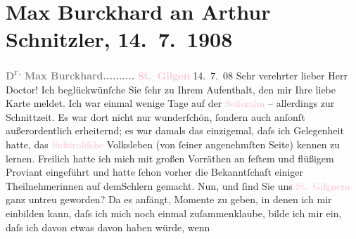 

               \section[Max Burckhard an Arthur Schnitzler, 14. 7. 1908]{ Max Burckhard an Arthur Schnitzler, 14. 7. 1908}\nopagebreak{}\rehead{ }\normalsize\beginnumbering{} \toendnotes[C]{\smallbreak\pagebreak[2]} 
\toendnotes[C]{\smallbreak}\pstart
           \noindent{}{\pb}\textcolor{gray}{\textbf{D\textsuperscript{r.} Max Burckhard}}\hfill \textcolor{gray}{\textbf{\strikeout{\textcolor{pink}{Wien, IX. Porzellangasse 48}{}\ledrightnote{\textcolor{pink}{Porzellangasse}}}{ }..........}}\pend
           \pstart
           \raggedleft{}\textcolor{gray}{\textbf{\textcolor{pink}{St. Gilgen}{}\ledrightnote{\textcolor{pink}{St. Gilgen}}}}{ }14. 7. 08\pend
           \pstart{}Sehr verehrter lieber Herr Doctor!\pend\pstart
           Ich beglückwünſche Sie ſehr  zu Ihrem
                    Aufenthalt, den mir Ihre liebe Karte meldet. Ich war einmal wenige Tage auf der
                        \textcolor{pink}{Seiſeralm}{}\ledrightnote{\textcolor{pink}{Seiser Alm}} – allerdings zur Schnittzeit. Es
                    war dort nicht nur wunderſchön, ſondern auch anſonſt außerordentlich erheiternd;
                    es war damals das einzigemal, daſs ich Gelegenheit hatte, das \textcolor{pink}{ſüdtiroliſche}{}\ledrightnote{\textcolor{pink}{Südtirol}} Volksleben (von ſeiner angenehmſten Seite)
                    kennen zu lernen. Freilich hatte ich mich mit großen Vorräthen an feſtem und
                    flüßigem Proviant eingeführt und hatte ſchon vorher die Bekanntſchaft einiger
                    Theilnehmerinnen auf demSchlern gemacht.\pend
           \pstart
           {\pb}Nun, und ſind Sie uns \textcolor{pink}{St. Gilgnern}{}\ledrightnote{\textcolor{pink}{St. Gilgen}} ganz untreu geworden? Da es anfängt, Momente
                    zu geben, in denen ich mir einbilden kann, daſs ich mich noch einmal
                    zuſammenklaube, bilde ich mir ein, daſs ich davon etwas davon haben würde, wenn
